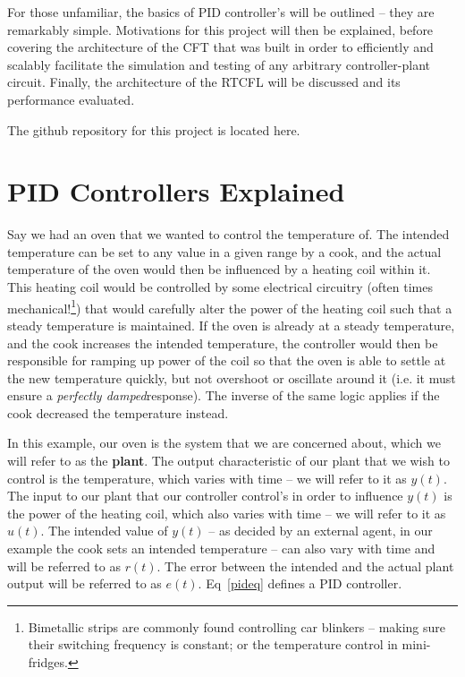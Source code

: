\documentclass[10pt,twocolumn,letterpaper]{article}
\begin{document}
        For those unfamiliar, the basics of PID controller's will be outlined -- they are remarkably simple. Motivations
        for this project will then be explained, before covering the architecture of the CFT that was built in order to
        efficiently and scalably facilitate the simulation and testing of any arbitrary controller-plant circuit.
        Finally, the architecture of the RTCFL will be discussed and its performance evaluated. 
        
        The github repository for this project is located here\cite{gitrepo}.

    \section{PID Controllers Explained} \label{pidexplained}

        Say we had an oven that we wanted to control the temperature of. The intended temperature can be set to any
        value in a given range by a cook, and the actual temperature of the oven would then be influenced by a heating
        coil within it. This heating coil would be controlled by some electrical circuitry (often times
        mechanical!\footnote{Bimetallic strips are commonly found controlling car blinkers -- making sure their
        switching frequency is constant; or the temperature control in mini-fridges.}) that would carefully alter the
        power of the heating coil such that a steady temperature is maintained. If the oven is already at a steady
        temperature, and the cook increases the intended temperature, the controller would then be responsible for
        ramping up power of the coil so that the oven is able to settle at the new temperature quickly, but not
        overshoot or oscillate around it (i.e. it must ensure a \textit{perfectly damped}\footnotemark[1] response). The
        inverse of the same logic applies if the cook decreased the temperature instead.

        In this example, our oven is the system that we are concerned about, which we will refer to as the
        \textbf{plant}. The output characteristic of our plant that we wish to control is the temperature, which varies
        with time -- we will refer to it as $y(t)$. The input to our plant that our controller control's in order to
        influence $y(t)$ is the power of the heating coil, which also varies with time -- we will refer to it as $u(t)$.
        The intended value of $y(t)$ -- as decided by an external agent, in our example the cook sets an intended
        temperature -- can also vary with time and will be referred to as $r(t)$. The error between the intended and the
        actual plant output will be referred to as $e(t)$. Eq~\ref{pideq} defines a PID controller.
        
\end{document}
